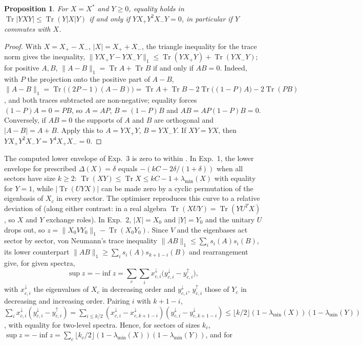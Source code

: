 \documentclass[11pt]{article}
\DeclareMathOperator{\Tr}{Tr}
\newtheorem{proposition}{Proposition}
\begin{document}
\begin{proposition}
For $X=X^*$ and $Y\ge0$, equality holds in $\Tr|YXY|\le\Tr(Y|X|Y)$ if and only if $YX_+Y^2X_-Y=0$, in particular
if $Y$ commutes with $X$.
\end{proposition}
\begin{proof}
With $X=X_+-X_-$, $|X|=X_++X_-$, the triangle inequality for the trace norm gives the inequality,
$\|YX_+Y-YX_-Y\|_1\le\Tr(YX_+Y)+\Tr(YX_-Y)$; for positive $A,B$, $\|A-B\|_1=\Tr A+\Tr B$ if and only if
$AB=0$. Indeed, with $P$ the projection onto the positive part of $A-B$,
$\|A-B\|_1=\Tr\bigl((2P-1)(A-B)\bigr)=\Tr A+\Tr B-2\Tr\bigl((1-P)A\bigr)-2\Tr(PB)$, and both traces subtracted are
non-negative; equality forces $(1-P)A=0=PB$, so $A=AP$, $B=(1-P)B$ and $AB=AP(1-P)B=0$. Conversely, if $AB=0$ the
supports of $A$ and $B$ are orthogonal and $|A-B|=A+B$. Apply this to $A=YX_+Y$, $B=YX_-Y$. If $XY=YX$, then $YX_+Y^2X_-Y=Y^4X_+X_-=0$.
\end{proof}
\noindent The computed lower envelope of Exp.~3 is zero to within . In Exp.~1, the lower envelope
for prescribed $\Delta(X)=\delta$ equals $-(kC-2\delta/(1+\delta))$ when all sectors have size $k\ge2$:
$\Tr(XY)\le\Tr X\le kC-1+\lambda_{\min}(X)$ with equality for $Y=1$, while $|\Tr(UYX)|$ can be made zero
by a cyclic permutation of the eigenbasis of $X_c$ in every sector. The optimiser reproduces this curve to a relative deviation of
 (along either contrast: in a real algebra
$\Tr(XUY)=\Tr(YU^TX)$, so $X$ and $Y$ exchange roles). In Exp.~2, $|X|=X_0$ and
$|Y|=Y_0$ and the unitary $U$ drops out, so $z=\|X_0VY_0\|_1-\Tr(X_0Y_0)$. Since $V$ and the eigenbases act
sector by sector, von Neumann's trace inequality $\|AB\|_1\le\sum_is_i(A)s_i(B)$, its lower counterpart
$\|AB\|_1\ge\sum_is_i(A)s_{k+1-i}(B)$ and rearrangement give, for given spectra,
\[
  \sup z=-\inf z=\sum_c\sum_i x_{c,i}^\downarrow\bigl(y_{c,i}^\downarrow-y_{c,i}^\uparrow\bigr),
\]
with $x_{c,i}^\downarrow$ the eigenvalues of $X_c$ in decreasing order and $y_{c,i}^\downarrow$, $y_{c,i}^\uparrow$ those of
$Y_c$ in decreasing and increasing order. Pairing $i$ with $k+1-i$,
$\sum_ix_{c,i}^\downarrow(y_{c,i}^\downarrow-y_{c,i}^\uparrow)=\sum_{i\le k/2}(x_{c,i}^\downarrow-x_{c,k+1-i}^\downarrow)
(y_{c,i}^\downarrow-y_{c,k+1-i}^\downarrow)\le\lfloor k/2\rfloor(1-\lambda_{\min}(X))(1-\lambda_{\min}(Y))$, with equality
for two-level spectra. Hence, for sectors of sizes $k_c$, $\sup z=-\inf z=\sum_c\lfloor k_c/2\rfloor(1-\lambda_{\min}(X))(1-\lambda_{\min}(Y))$, and for
\end{document}
